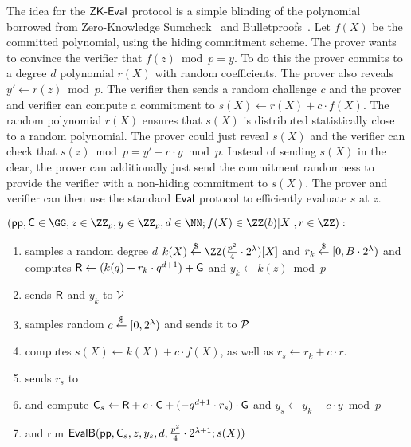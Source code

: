 The idea for the $\textsf{{ZK-Eval}}$ protocol is a simple blinding of the polynomial borrowed from Zero-Knowledge Sumcheck~\cite{EPRINT:ChiForSpo17} and Bulletproofs~\cite{EC:BCCGP16,SP:BBBPWM18}. Let $f(X)$ be the committed polynomial, using the hiding commitment scheme. The prover wants to convince the verifier that $f(z)\bmod p=y$. To do this the prover commits to a degree $d$ polynomial $r(X)$ with random coefficients. The prover also reveals $y'\gets r(z)\bmod p$. The verifier then sends a random challenge $c$ and the prover and verifier can compute a commitment to $s(X)\gets r(X)+c\cdot f(X)$. The random polynomial $r(X)$ ensures that $s(X)$ is distributed statistically close to a random polynomial. The prover could just reveal $s(X)$ and the verifier can check that $s(z)\bmod p=y'+c \cdot y\bmod p$. Instead of sending $s(X)$ in the clear, the prover can additionally just send the commitment randomness to provide the verifier with a non-hiding commitment to $s(X)$. The prover and verifier can then use the standard $\textsf{{Eval}}$ protocol to efficiently evaluate $s$ at $z$.
 \noindent\begin{mdframed}[userdefinedwidth=\textwidth]
\begin{minipage}{\textwidth}
	\begin{flushleft}
	$(\params, \gr{C} \in \GG, z \in \ZZ_p, y \in \ZZ_p, d \in \NN; f(X) \in \ZZ(b)[X], r \in \ZZ):$\\
	\begin{enumerate}[nolistsep]
		    \item \prover samples a random degree $d$ $k(X) \sample \ZZ(\frac{p^2}{4}\cdot 2^\lambda)[X]$ and $r_k \overset{\$}{\gets} [0,B\cdot 2^\lambda)$ and computes $\gr{R} \gets (k(q) + r_k \cdot q^{d+1})+\gr{g}$ and $y_k \gets k(z) \bmod p$
		    \item \prover sends $\gr{R}$ and $y_k$ to $\mathcal{V}$
		    \item \verifier samples random $c\overset{\$}{\gets} [0,2^\lambda)$ and sends it to $\mathcal{P}$
		    \item \prover computes $s(X)\gets k(X) + c \cdot f(X)$, as well as $r_s \gets r_k + c\cdot r$.
		    \item \prover sends $r_s$ to \verifier
		    \item \prover and \verifier compute $\gr{C}_s\gets \gr{R} + c\cdot \gr{C} +(-q^{d+1}\cdot r_s)\cdot \gr{g}$ and $y_s\gets y_k+c \cdot y \bmod p$ 
		    \item \prover and \verifier run $\pro{EvalB}(\crs,\gr{C}_s,z,y_s,d,\frac{p^2}{4}\cdot 2^{\lambda+1};s(X))$ 		   		\end{enumerate}
	\end{flushleft}
\end{minipage}
\end{mdframed}

